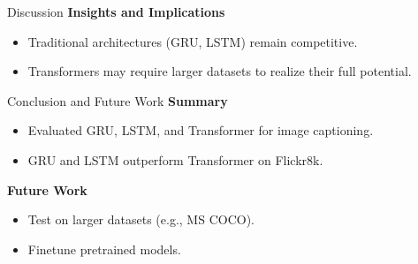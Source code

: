 \documentclass[10pt]{beamer}
\theoremstyle{remark}
\begin{document}
\begin{frame}{Discussion}
	\textbf{Insights and Implications}
	\begin{itemize}
			\item Traditional architectures (GRU, LSTM) remain competitive.
			\item Transformers may require larger datasets to realize their full potential.
	\end{itemize}
\end{frame}

\begin{frame}{Conclusion and Future Work}
	\textbf{Summary}
	\begin{itemize}
			\item Evaluated GRU, LSTM, and Transformer for image captioning.
			\item GRU and LSTM outperform Transformer on Flickr8k.
	\end{itemize}
	\textbf{Future Work}
	\begin{itemize}
			\item Test on larger datasets (e.g., MS COCO).
			\item Finetune pretrained models.
	\end{itemize}
\end{frame}
\end{document}
